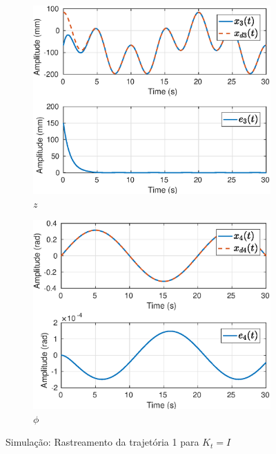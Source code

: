 \begin{figure}[H]
\begin{subfigure}{.5\textwidth}
  \centering
  \includegraphics[width=\linewidth]{./img/simul_delay_zoh1/x3.eps}
  \caption{$z$}
  \label{fig:simul_traj1_x3}
\end{subfigure}%
\begin{subfigure}{.5\textwidth}
  \centering
  \includegraphics[width=\linewidth]{./img/simul_delay_zoh1/x4.eps}
  \caption{$\phi$}
  \label{fig:simul_traj1_x4}
\end{subfigure}
\caption{Simulação: Rastreamento da trajetória 1 para ${K}_t = {I}$}
\label{fig:simulx}
\end{figure}

